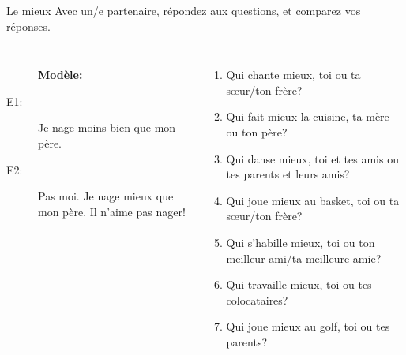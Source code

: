 \begin{frame}{Le mieux}
  Avec un/e partenaire, répondez aux questions, et comparez vos réponses. \\
  \begin{columns}
    \scriptsize
      \begin{description}
        \item[] \textbf{Modèle:}
        \item[] 
        \item[E1:] Je nage moins bien que mon père.
        \item[E2:] Pas moi. Je nage mieux que mon père. Il n'aime pas nager!
      \end{description}
      \begin{enumerate}
        \item Qui chante mieux, toi ou ta sœur/ton frère?
        \item Qui fait mieux la cuisine, ta mère ou ton père?
        \item Qui danse mieux, toi et tes amis ou tes parents et leurs amis?
        \item Qui joue mieux au basket, toi ou ta sœur/ton frère?
        \item Qui s'habille mieux, toi ou ton meilleur ami/ta meilleure amie?
        \item Qui travaille mieux, toi ou tes colocataires?
        \item Qui joue mieux au golf, toi ou tes parents?
      \end{enumerate}
  \end{columns}
\end{frame}